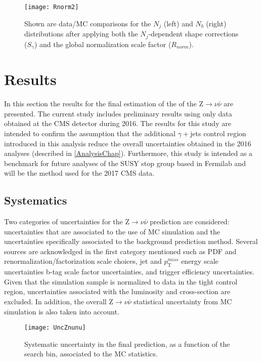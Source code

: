 \begin{figure}[H]
\begin{center}
\texttt{[image: Rnorm2]}
\end{center}
\vspace{-1em}
\caption{Shown are data/MC comparisons for the $N_j$ (left) and $N_b$ (right) distributions after applying both the $N_j$-dependent shape corrections ($S_\gamma$) and the global normalization scale factor ($R_{norm}$).}
\label{Rnorm2}
\end{figure}

\section{Results}

In this section the results for the final estimation of the of the Z$\rightarrow\nu\bar{\nu}$ are presented. The current study includes preliminary results using only data obtained at the CMS detector during 2016. The results for this study are intended to confirm the assumption that the additional $\gamma+$jets control region introduced in this analysis reduce the overall uncertainties obtained in the 2016 analyses (described in \autoref{AnalysisChap}). Furthermore, this study is intended as a benchmark for future analyses of the SUSY stop group based in Fermilab and will be the method used for the 2017 CMS data.

\subsection{Systematics}\label{systematics}

Two categories of uncertainties for the Z$\rightarrow\nu\bar{\nu}$ prediction are considered: uncertainties that are associated to the use of MC simulation and the uncertainties specifically associated to the background prediction method. Several sources are acknowledged in the first category mentioned such as PDF and renormalization/factorization scale choices, jet and $p_\text{T}^{miss}$ energy scale uncertainties b-tag scale factor uncertainties, and trigger efficiency uncertainties. Given that the simulation sample is normalized to data in the tight control region, uncertainties associated with the luminosity and cross-section are excluded. In addition, the overall Z$\rightarrow\nu\bar{\nu}$ statistical uncertainty from MC simulation is also taken into account.\\

\begin{figure}[H]
\begin{center}
\texttt{[image: UncZnunu]}
\end{center}
\vspace{-1em}
\caption{Systematic uncertainty in the final prediction, as a function of the search bin, associated to the MC statistics.}
\label{UncZnunu}
\end{figure}

